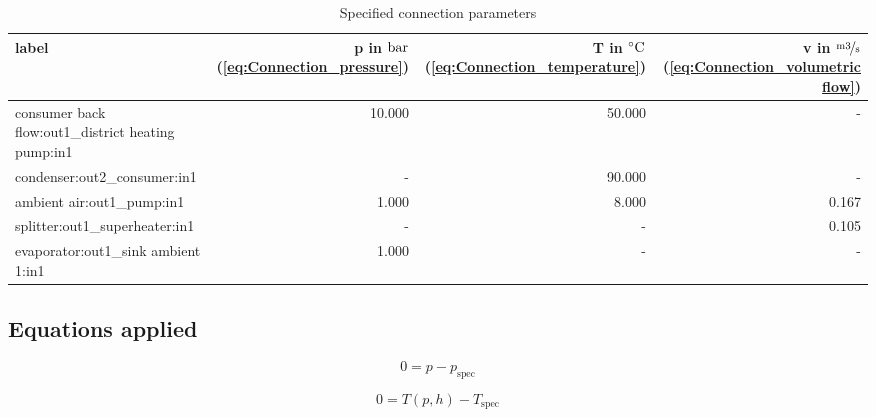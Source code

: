 \begin{table}[H]\begin{center}
\begin{tabular}{lrrr}
\toprule
                                              label &  p in $\unit[]{bar}$ (\ref{eq:Connection_pressure}) &  T in $\unit[]{^\circ C}$ (\ref{eq:Connection_temperature}) &  v in $\unitfrac[]{m3}{s}$ (\ref{eq:Connection_volumetric flow}) \\
\midrule
 consumer back flow:out1\_district heating pump:in1 &                                              10.000 &                                                      50.000 &                                                                - \\
                       condenser:out2\_consumer:in1 &                                                   - &                                                      90.000 &                                                                - \\
                         ambient air:out1\_pump:in1 &                                               1.000 &                                                       8.000 &                                                            0.167 \\
                     splitter:out1\_superheater:in1 &                                                   - &                                                           - &                                                            0.105 \\
                evaporator:out1\_sink ambient 1:in1 &                                               1.000 &                                                           - &                                                                - \\
\bottomrule
\end{tabular}
\caption{Specified connection parameters}
\end{center}\end{table}

\subsection{Equations applied}

\begin{equation}
\label{eq:Connection_pressure}
0 = p - p_\mathrm{spec}
\end{equation}

\begin{equation}
\label{eq:Connection_temperature}
0 = T \left(p, h \right) - T_\mathrm{spec}
\end{equation}

